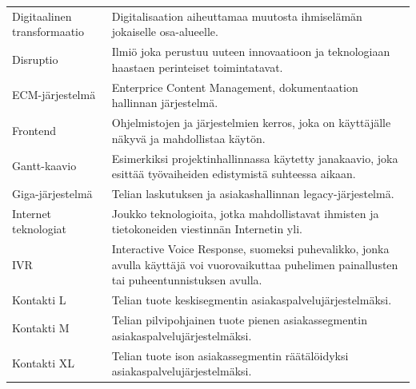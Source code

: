 \documentclass[finnish,12pt,a4paper,pdftex]{article}
\begin{document}
\begin{table}[h!]
\centering
\label{my-label}

\begin{tabular}{ p{5cm}  p{\textwidth-6cm} }

Digitaalinen transformaatio & Digitalisaation aiheuttamaa muutosta ihmiselämän jokaiselle osa-alueelle.                                                                        \\[0.9em]

Disruptio                   & Ilmiö joka perustuu uuteen innovaatioon ja teknologiaan haastaen perinteiset toimintatavat.                                                       \\[0.9em]
ECM-järjestelmä             & Enterprice Content Management, dokumentaation hallinnan järjestelmä.                                                                              \\[0.9em]
Frontend                    & Ohjelmistojen ja järjestelmien kerros, joka on käyttäjälle näkyvä ja mahdollistaa käytön.                                                        \\[0.9em]
Gantt-kaavio                & Esimerkiksi projektinhallinnassa käytetty janakaavio, joka esittää työvaiheiden edistymistä suhteessa aikaan.                                    \\[0.9em]
Giga-järjestelmä            & Telian laskutuksen ja asiakashallinnan legacy-järjestelmä.                                                                                        \\[0.9em]
Internet teknologiat        & Joukko teknologioita, jotka mahdollistavat ihmisten ja tietokoneiden viestinnän Internetin yli.                                                  \\[0.9em]
IVR                         & Interactive Voice Response, suomeksi puhevalikko, jonka avulla käyttäjä voi vuorovaikuttaa puhelimen painallusten tai puheentunnistuksen avulla. \\[0.9em]
Kontakti L                  & Telian tuote keskisegmentin asiakaspalvelujärjestelmäksi.                                                                                         \\[0.9em]
Kontakti M    		        & Telian pilvipohjainen tuote pienen asiakassegmentin asiakaspalvelujärjestelmäksi.                                                                \\[0.9em]
Kontakti XL   				& Telian tuote ison asiakassegmentin räätälöidyksi asiakaspalvelujärjestelmäksi.                                                                   \\[0.9em]

\end{tabular}
\end{table}
\end{document}
